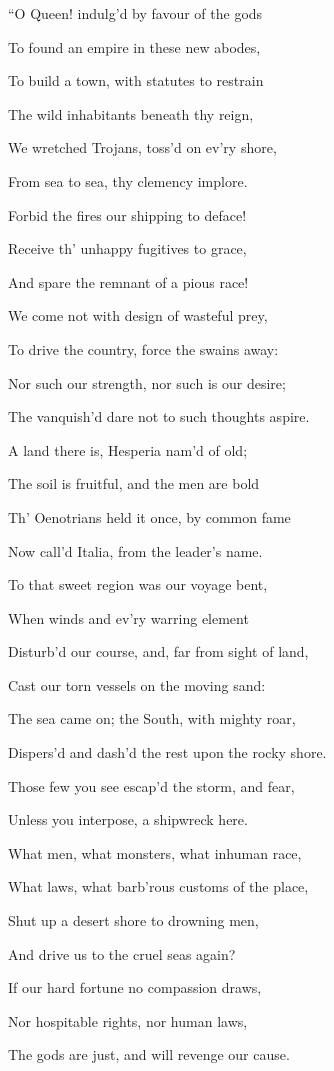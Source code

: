 “O Queen! indulg’d by favour of the gods

To found an empire in these new abodes,

To build a town, with statutes to restrain

The wild inhabitants beneath thy reign,

We wretched Trojans, toss’d on ev’ry shore,

From sea to sea, thy clemency implore.

Forbid the fires our shipping to deface!

Receive th’ unhappy fugitives to grace,

And spare the remnant of a pious race!

We come not with design of wasteful prey,

To drive the country, force the swains away:

Nor such our strength, nor such is our desire;

The vanquish’d dare not to such thoughts aspire.

A land there is, Hesperia nam’d of old;

The soil is fruitful, and the men are bold

Th’ Oenotrians held it once, by common fame

Now call’d Italia, from the leader’s name.

To that sweet region was our voyage bent,

When winds and ev’ry warring element

Disturb’d our course, and, far from sight of land,

Cast our torn vessels on the moving sand:

The sea came on; the South, with mighty roar,

Dispers’d and dash’d the rest upon the rocky shore.

Those few you see escap’d the storm, and fear,

Unless you interpose, a shipwreck here.

What men, what monsters, what inhuman race,

What laws, what barb’rous customs of the place,

Shut up a desert shore to drowning men,

And drive us to the cruel seas again?

If our hard fortune no compassion draws,

Nor hospitable rights, nor human laws,

The gods are just, and will revenge our cause.

